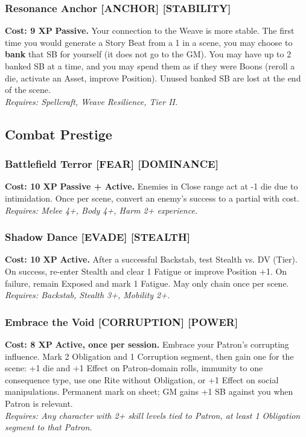 \documentclass[12pt,a4paper]{book}
\begin{document}
\subsubsection*{Resonance Anchor \textnormal{[ANCHOR] [STABILITY]}}
\label{talent:resonance-anchor}
\textbf{Cost: 9 XP} \textbf{Passive.} Your connection to the Weave is more stable. The first time you would generate a Story Beat from a 1 in a scene, you may choose to \textbf{bank} that SB for yourself (it does not go to the GM). You may have up to 2 banked SB at a time, and you may spend them as if they were Boons (reroll a die, activate an Asset, improve Position). Unused banked SB are lost at the end of the scene. \\
\textit{Requires: Spellcraft, Weave Resilience, Tier II.}

\subsection*{Combat Prestige}
\label{sec:prestige-combat}

\subsubsection*{Battlefield Terror \textnormal{[FEAR] [DOMINANCE]}}
\label{talent:battlefield-terror}
\textbf{Cost: 10 XP} \textbf{Passive + Active.} Enemies in Close range act at -1 die due to intimidation. Once per scene, convert an enemy's success to a partial with cost. \\
\textit{Requires: Melee 4+, Body 4+, Harm 2+ experience.}

\subsubsection*{Shadow Dance \textnormal{[EVADE] [STEALTH]}}
\label{talent:shadow-dance}
\textbf{Cost: 10 XP} \textbf{Active.} After a successful Backstab, test Stealth vs. DV (Tier). On success, re-enter Stealth and clear 1 Fatigue or improve Position +1. On failure, remain Exposed and mark 1 Fatigue. May only chain once per scene. \\
\textit{Requires: Backstab, Stealth 3+, Mobility 2+.}

\subsubsection*{Embrace the Void \textnormal{[CORRUPTION] [POWER]}}
\label{talent:embrace-the-void}
\textbf{Cost: 8 XP} \textbf{Active, once per session.} Embrace your Patron's corrupting influence. Mark 2 Obligation and 1 Corruption segment, then gain one for the scene: +1 die and +1 Effect on Patron-domain rolls, immunity to one consequence type, use one Rite without Obligation, or +1 Effect on social manipulations. Permanent mark on sheet; GM gains +1 SB against you when Patron is relevant. \\
\textit{Requires: Any character with 2+ skill levels tied to Patron, at least 1 Obligation segment to that Patron.}
\end{document}

